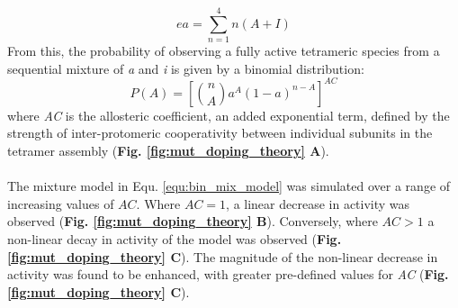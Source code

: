%
%
\begin{equation}
ea = \sum_{n=1}^{4} n(A+I) 
\end{equation}
%
%
From this, the probability of observing a fully active tetrameric species from a sequential mixture of \textit{a} and \textit{i} is given by a binomial distribution:
%
\begin{equation}
P(A) = \left[ \binom{n}{A} a^{A} (1-a)^{n-A} \right]^{AC}
\label{equ:bin_mix_model}
\end{equation}
%
%
where \textit{AC} is the allosteric coefficient, an added exponential term, defined by the strength of inter-protomeric cooperativity between individual subunits in the tetramer assembly (\textbf{Fig. \ref{fig:mut_doping_theory} A}).
%
%
\\\\
%
%
The mixture model in Equ. \ref{equ:bin_mix_model} was simulated over a range of increasing values of $AC$. Where $AC = 1$, a linear decrease in activity was observed (\textbf{Fig. \ref{fig:mut_doping_theory} B}). Conversely, where $AC > 1$ a non-linear decay in activity of the model was observed (\textbf{Fig. \ref{fig:mut_doping_theory} C}). The magnitude of the non-linear decrease in activity was found to be enhanced, with greater pre-defined values for \textit{AC} (\textbf{Fig. \ref{fig:mut_doping_theory} C}). 


